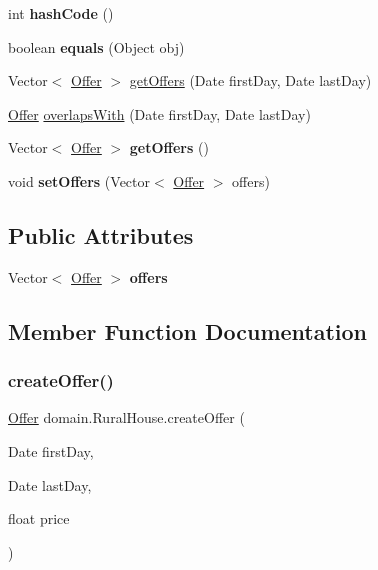 \begin{DoxyCompactItemize}
int {\bfseries hash\+Code} ()
\item 
\mbox{\label{classdomain_1_1_rural_house_a92f3f1fa5d605f34e95f4e4175ef2629}} 
boolean {\bfseries equals} (Object obj)
\item 
Vector$<$ \mbox{\hyperlink{classdomain_1_1_offer}{Offer}} $>$ \mbox{\hyperlink{classdomain_1_1_rural_house_abe770c8a0fbcfed83a358d84bacd66f7}{get\+Offers}} (Date first\+Day, Date last\+Day)
\item 
\mbox{\hyperlink{classdomain_1_1_offer}{Offer}} \mbox{\hyperlink{classdomain_1_1_rural_house_ac5596b06728d8bf377993088520fbc9e}{overlaps\+With}} (Date first\+Day, Date last\+Day)
\item 
\mbox{\label{classdomain_1_1_rural_house_ae653409c7556fa8b3ccabd0c17604666}} 
Vector$<$ \mbox{\hyperlink{classdomain_1_1_offer}{Offer}} $>$ {\bfseries get\+Offers} ()
\item 
\mbox{\label{classdomain_1_1_rural_house_a64672c1962a8df6e8203f08f898404ba}} 
void {\bfseries set\+Offers} (Vector$<$ \mbox{\hyperlink{classdomain_1_1_offer}{Offer}} $>$ offers)
\end{DoxyCompactItemize}
\subsection*{Public Attributes}
\begin{DoxyCompactItemize}
\item 
\mbox{\label{classdomain_1_1_rural_house_a3988c813bc7b8918e515b161bc3cdd20}} 
Vector$<$ \mbox{\hyperlink{classdomain_1_1_offer}{Offer}} $>$ {\bfseries offers}
\end{DoxyCompactItemize}


\subsection{Member Function Documentation}
\mbox{\label{classdomain_1_1_rural_house_a58e17e08a7b28a75bc1b8e3d6ac01764}} 
\subsubsection{\texorpdfstring{createOffer()}{createOffer()}}
{\footnotesize\ttfamily \mbox{\hyperlink{classdomain_1_1_offer}{Offer}} domain.\+Rural\+House.\+create\+Offer (\begin{DoxyParamCaption}\item[{Date}]{first\+Day,  }\item[{Date}]{last\+Day,  }\item[{float}]{price }\end{DoxyParamCaption})}

